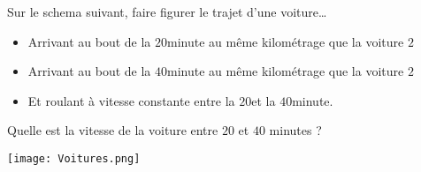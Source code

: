\documentclass{article}
\begin{document}
\begin{exercize}
Sur le schema suivant, faire figurer le trajet d'une voiture\dots
\begin{itemize}
\item Arrivant au bout de la $20$\ieme minute au même kilométrage que la voiture $2$
\item Arrivant au bout de la $40$\ieme minute au même kilométrage que la voiture $2$
\item Et roulant à vitesse constante entre la $20$\ieme et la $40$\ieme minute.
\end{itemize}
Quelle est la vitesse de la voiture entre $20$ et $40$ minutes ?
\end{exercize}
\begin{center}
\texttt{[image: Voitures.png]}
\end{center}
\newpage
\end{document}
